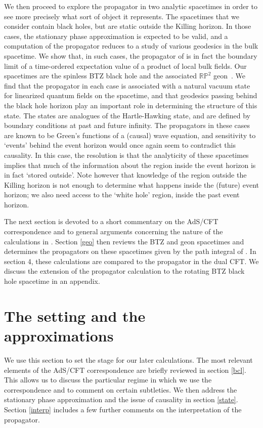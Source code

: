\documentclass[a4paper,12pt]{article}
\begin{document}
We then proceed to explore the propagator in two analytic spacetimes
in order to see more precisely what sort of object it represents.  The
spacetimes that we consider contain black holes, but are static
outside the Killing horizon.  In those cases, the stationary phase
approximation is expected to be valid, and a computation of the
propagator reduces to a study of various geodesics in the bulk
spacetime.  We show that, in such cases, the propagator of
\cite{holopart} is in fact the boundary limit of a time-ordered
expectation value of a product of local bulk fields.  Our spacetimes
are the spinless BTZ black hole
\cite{BTZ} and the associated $\mathbb R \mathbb P ^2$
geon~\cite{louko:geon}.  We find that the propagator in each case
is associated with a natural vacuum state for linearized quantum
fields on the spacetime, and that geodesics passing behind the black
hole horizon play an important role in determining the structure of
this state.  The states are analogues of the Hartle-Hawking state,
and are defined by boundary conditions at past and future
infinity. The propagators in these cases are known to be Green's
functions of a (causal) wave equation, and sensitivity to `events'
behind the event horizon would once again seem to contradict this
causality. In this case, the resolution is that the analyticity of
these spacetimes implies that much of the information about the region
inside the event horizon is in fact `stored outside'. Note however
that knowledge of the region outside the Killing horizon is not enough
to determine what happens inside the (future) event horizon; we also
need access to the `white hole' region, inside the past event horizon.

The next section is devoted to a short commentary on the AdS/CFT
correspondence and to general arguments concerning the nature of the
calculations in \cite{holopart}.  Section \ref{geo} then reviews the
BTZ and geon spacetimes and determines the propagators on these
spacetimes given by the path integral of \cite{holopart}.  In section
4, these calculations are compared to the propagator in the dual
CFT. We discuss the extension of the propagator calculation to the
rotating BTZ black hole spacetime in an appendix.

\section{The setting and the approximations}
\label{gen}

We use this section to set the stage for our later calculations.  The
most relevant elements of the AdS/CFT correspondence are briefly
reviewed in section \ref{bcl}.  This allows us to discuss the
particular regime in which we use the correspondence and to comment on
certain subtleties.  We then address the stationary phase
approximation and the issue of causality in section \ref{state}.
Section \ref{interp} includes a few further comments on the
interpretation of the propagator.
\end{document}
